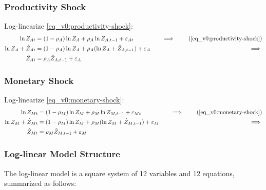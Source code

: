 \documentclass[../thesis.tex]{subfiles}
\begin{document}
	
	\subsubsection*{Productivity Shock}
	
	Log-linearize \ref{eq_v0:productivity-shock}:
	\begin{alignat}{2}
		\ln{Z_{At}} &= (1-\rho_A)\ln{Z_A} + \rho_A\ln{Z_{A,t-1}} + \varepsilon_{At} &\implies \tag{\ref{eq_v0:productivity-shock}} \\
		\ln{Z_{A}} + \hat{Z}_{At} &= (1-\rho_A) \ln{Z_A} + \rho_A (\ln{Z_{A}} + \hat{Z}_{A,t-1}) + \varepsilon_{A} \quad &\implies \nonumber \\
		\hat{Z}_{At} &= \rho_A \hat{Z}_{A,t-1} + \varepsilon_{A} \label{eq_v0:ll-productivity-shock}
	\end{alignat}
	
	
	\subsubsection*{Monetary Shock}
	
	Log-linearize \ref{eq_v0:monetary-shock}:
	\begin{alignat}{2}
		\ln{Z_{Mt}} &= (1-\rho_M)\ln{Z_M} + \rho_M\ln{Z_{M,t-1}} + \varepsilon_{Mt} &\implies \tag{\ref{eq_v0:monetary-shock}} \\
		\ln{Z_{M}} + \hat{Z}_{Mt} &= (1-\rho_M) \ln{Z_M} + \rho_M (\ln{Z_{M}} + \hat{Z}_{M,t-1}) + \varepsilon_{M} \quad &\implies \nonumber \\
		\hat{Z}_{Mt} &= \rho_M \hat{Z}_{M,t-1} + \varepsilon_{M} \label{eq_v0:ll-monetary-shock}
	\end{alignat}
	
	
	
	\subsubsection{Log-linear Model Structure}
	
	The log-linear model is a square system of 12 variables and 12 equations, summarized as follows:
	
\end{document}

